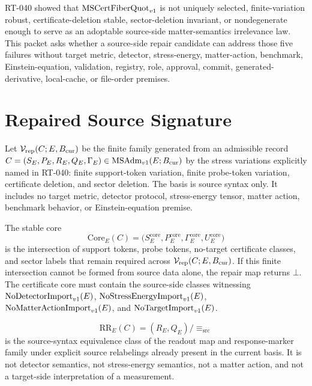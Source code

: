 RT-040 showed that \(\mathrm{MSCertFiberQuot}_{v1}\) is not uniquely selected,
finite-variation robust, certificate-deletion stable, sector-deletion
invariant, or nondegenerate enough to serve as an adoptable source-side
matter-semantics irrelevance law. This packet asks whether a source-side
repair candidate can address those five failures without target metric,
detector, stress-energy, matter-action, benchmark, Einstein-equation,
validation, registry, role, approval, commit, generated-derivative,
local-cache, or file-order premises.

\section{Repaired Source Signature}

\begin{definition}
Let \(\mathcal V_{\mathrm{rep}}(C;E,B_{\mathrm{cur}})\) be the finite family generated
from an admissible record \(C=(S_E,P_E,R_E,Q_E,\Gamma_E)\in\mathrm{MSAdm}_{v1}(E;B_{\mathrm{cur}})\)
by the stress variations explicitly named in RT-040: finite support-token
variation, finite probe-token variation, certificate deletion, and sector
deletion. The basis is source syntax only. It includes no target metric,
detector protocol, stress-energy tensor, matter action, benchmark behavior,
or Einstein-equation premise.
\end{definition}

\begin{definition}
The stable core
\[
  \mathrm{Core}_E(C)=
  \bigl(S_E^{\mathrm{core}},P_E^{\mathrm{core}},
  \Gamma_E^{\mathrm{core}},U_E^{\mathrm{core}}\bigr)
\]
is the intersection of support tokens, probe tokens, no-target certificate
classes, and sector labels that remain required across
\(\mathcal V_{\mathrm{rep}}(C;E,B_{\mathrm{cur}})\). If this finite intersection cannot
be formed from source data alone, the repair map returns \(\bot\). The
certificate core must contain the source-side classes witnessing
\(\mathrm{NoDetectorImport}_{v1}(E)\), \(\mathrm{NoStressEnergyImport}_{v1}(E)\), \(\mathrm{NoMatterActionImport}_{v1}(E)\), and \(\mathrm{NoTargetImport}_{v1}(E)\).
\end{definition}

\begin{definition}
\[
  \mathrm{RR}_E(C)=(R_E,Q_E)/{\equiv_{\mathrm{src}}}
\]
is the source-syntax equivalence class of the readout map and response-marker
family under explicit source relabelings already present in the current
basis. It is not detector semantics, not stress-energy semantics, not a matter
action, and not a target-side interpretation of a measurement.
\end{definition}

